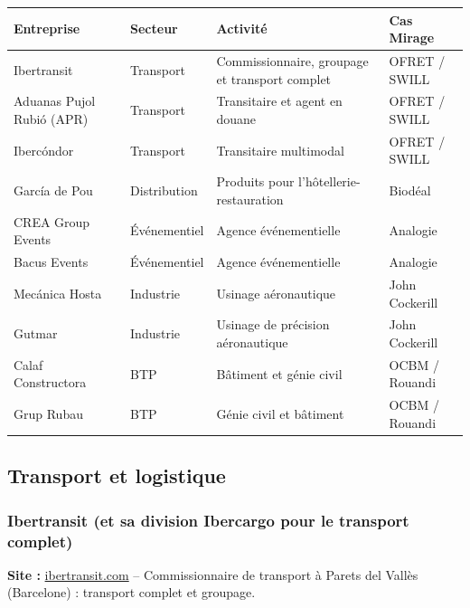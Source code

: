 \documentclass[11pt,a4paper]{article}
\begin{document}
\begin{center}
\small
\begin{tabularx}{\textwidth}{@{}l l X l@{}}
\toprule
\textbf{Entreprise} & \textbf{Secteur} & \textbf{Activité} & \textbf{Cas Mirage} \\
\midrule
Ibertransit & Transport & Commissionnaire, groupage et transport complet & OFRET / SWILL \\
Aduanas Pujol Rubió (APR) & Transport & Transitaire et agent en douane & OFRET / SWILL \\
Ibercóndor & Transport & Transitaire multimodal & OFRET / SWILL \\
García de Pou & Distribution & Produits pour l'hôtellerie-restauration & Biodéal \\
CREA Group Events & Événementiel & Agence événementielle & Analogie \\
Bacus Events & Événementiel & Agence événementielle & Analogie \\
Mecánica Hosta & Industrie & Usinage aéronautique & John Cockerill \\
Gutmar & Industrie & Usinage de précision aéronautique & John Cockerill \\
Calaf Constructora & BTP & Bâtiment et génie civil & OCBM / Rouandi \\
Grup Rubau & BTP & Génie civil et bâtiment & OCBM / Rouandi \\
\bottomrule
\end{tabularx}
\end{center}

\subsection{Transport et logistique}

\subsubsection{Ibertransit (et sa division Ibercargo pour le transport complet)}
\textbf{Site :} \href{https://ibertransit.com/}{ibertransit.com} -- Commissionnaire de transport à Parets del Vallès (Barcelone) : transport complet et groupage.
\end{document}
